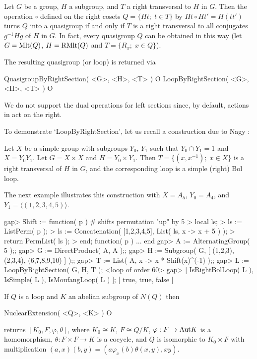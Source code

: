 Let $G$ be a group, $H$ a subgroup, and $T$ a right
transversal to $H$ in $G$. Then the operation $\circ$
defined on the right cosets $Q = \{Ht;\;t\in T\}$ by $Ht\circ Ht' = H(tt')$
turns $Q$ into a quasigroup if and only if $T$ is a right transversal to all
conjugates $g^{-1}Hg$ of $H$ in $G$. In fact, every quasigroup $Q$ can be
obtained in this way (let $G={\rm{Mlt}}(Q)$, $H={\rm{RMlt}}(Q)$ and
$T=\{R_x;\;x\in Q\}$).

The resulting quasigroup (or loop) is returned via

\>QuasigroupByRightSection( <G>, <H>, <T> ) O
\>LoopByRightSection( <G>, <H>, <T> ) O

We do not support the dual operations for left sections since, by default,
actions in {\GAP} act on the right.

To demonstrate `LoopByRightSection', let us recall a construction due to Nagy \cite{Na}:

Let $X$ be a simple group with subgroups $Y_0$, $Y_1$ such that $Y_0\cap Y_1=1$
and $X=Y_0Y_1$. Let $G=X\times X$ and $H=Y_0\times Y_1$. Then $T =
\{(x,x^{-1});\; x\in X\}$ is a right transversal of $H$ in $G$, and the
corresponding loop is a simple (right) Bol loop.

The next example illustrates this construction with $X=A_5$, $Y_0=A_4$, and
$Y_1 = \langle(1,2,3,4,5)\rangle$.

\beginexample
gap> Shift := function( p ) # shifts permutation "up" by 5
>       local ls;
>       ls := ListPerm( p );
>       ls := Concatenation( [1,2,3,4,5], List( ls, x -> x + 5 ) );
>       return PermList( ls );
> end;
function( p ) ... end
gap> A := AlternatingGroup( 5 );;
gap> G := DirectProduct( A, A );;
gap> H := Subgroup( G, [ (1,2,3), (2,3,4), (6,7,8,9,10) ] );;
gap> T := List( A, x -> x * Shift(x)^(-1) );;
gap> L := LoopByRightSection( G, H, T );
<loop of order 60>
gap> [ IsRightBolLoop( L ), IsSimple( L ), IsMoufangLoop( L ) ];
[ true, true, false ]
\endexample


If $Q$ is a loop and $K$ an abelian subgroup of $N(Q)$ then

\>NuclearExtension( <Q>, <K> ) O

returns $[K_0, F, \varphi, \theta]$, where $K_0\cong K$, $F\cong Q/K$,
$\varphi:F\to{\rm{Aut}}{K}$ is a homomorphism, $\theta:F\times F\to K$ is a
cocycle, and $Q$ is isomorphic to $K_0\times F$ with multiplication $(a,x)(b,y)
= (a\varphi_x(b)\theta(x,y),xy)$.

